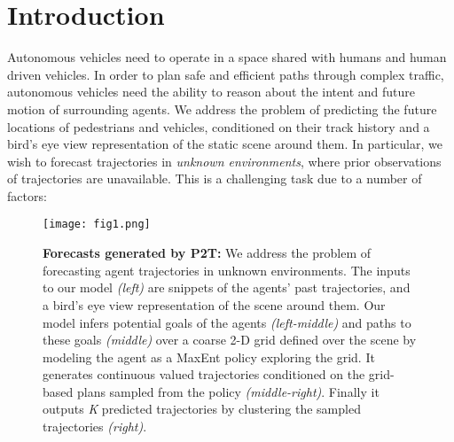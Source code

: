 \documentclass[journal]{IEEEtran}
\begin{document}
\IEEEdisplaynontitleabstractindextext




\IEEEpeerreviewmaketitle



\section{Introduction}
\label{sec:introduction}




Autonomous vehicles need to operate in a space shared with humans and human driven vehicles. In order to plan safe and efficient paths through complex traffic, autonomous vehicles need the ability to reason about the intent and future motion of surrounding agents. We address the problem of predicting the future locations of pedestrians and vehicles, conditioned on their track history and a bird's eye view representation of the static scene around them. In particular, we wish to forecast trajectories in \textit{unknown environments}, where prior observations of trajectories are unavailable. This is a challenging task due to a number of factors:
 
\begin{figure*}[t]
\centering
\texttt{[image: fig1.png]}
\caption{\textbf{Forecasts generated by P2T:}  We address the problem of forecasting agent trajectories in unknown environments. The inputs to our model \textit{(left)} are snippets of the agents' past trajectories, and a bird's eye view representation of the scene around them. Our model infers potential goals of the agents \textit{(left-middle)} and paths to these goals \textit{(middle)} over a coarse 2-D grid defined over the scene by modeling the agent as a MaxEnt policy exploring the grid. It generates continuous valued trajectories conditioned on the grid-based plans sampled from the policy \textit{(middle-right)}. Finally it outputs \textit{K} predicted trajectories by clustering the sampled trajectories \textit{(right)}.}
\label{fig_1}
\end{figure*}
\end{document}
